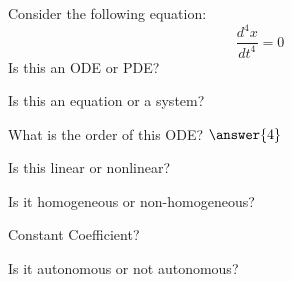 \documentclass{ximera}
\begin{document}
\begin{exercise}
    Consider the following equation:  
    \[
        \frac{d^4 x}{dt^4} = 0
    \]
    Is this an ODE or PDE?
    \begin{multipleChoice}
    \end{multipleChoice}
    \begin{problem}
        Is this an equation or a system?
        \begin{multipleChoice}
        \end{multipleChoice}
        
        \begin{problem}
            What is the order of this ODE? $\answer{4}$
            
            \begin{problem}
                Is this linear or nonlinear?
                \begin{multipleChoice}
                \end{multipleChoice}
                
                \begin{problem}
                    Is it homogeneous or non-homogeneous?
                    \begin{multipleChoice}
                    \end{multipleChoice}
                    
                    \begin{problem}
                        Constant Coefficient?
                        \begin{multipleChoice}
                        \end{multipleChoice}
                    \end{problem}
                \end{problem}
            \end{problem}
        \end{problem}
    \end{problem}
    \begin{problem}
        Is it autonomous or not autonomous?
        \begin{multipleChoice}
        \end{multipleChoice}
    \end{problem}
\end{exercise}
\end{document}
